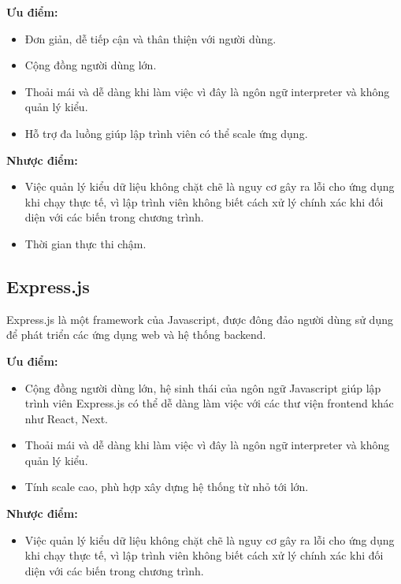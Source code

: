 \textbf{Ưu điểm:}
\begin{itemize}
    \item Đơn giản, dễ tiếp cận và thân thiện với người dùng.
    \item Cộng đồng người dùng lớn.
    \item Thoải mái và dễ dàng khi làm việc vì đây là ngôn ngữ interpreter và không quản lý kiểu.
    \item Hỗ trợ đa luồng giúp lập trình viên có thể scale ứng dụng.
\end{itemize}

\textbf{Nhược điểm:}
\begin{itemize}
    \item Việc quản lý kiểu dữ liệu không chặt chẽ là nguy cơ gây ra lỗi cho ứng dụng khi chạy thực tế, vì lập trình viên không biết cách xử lý chính xác khi đối diện với các biến trong chương trình.
    \item Thời gian thực thi chậm.
\end{itemize}

\subsection{Express.js}
Express.js là một framework của Javascript, được đông đảo người dùng sử dụng để phát triển các ứng dụng web và hệ thống backend.

\textbf{Ưu điểm:}
\begin{itemize}
    \item Cộng đồng người dùng lớn, hệ sinh thái của ngôn ngữ Javascript giúp lập trình viên Express.js có thể dễ dàng làm việc với các thư viện frontend khác như React, Next.
    \item Thoải mái và dễ dàng khi làm việc vì đây là ngôn ngữ interpreter và không quản lý kiểu.
    \item Tính scale cao, phù hợp xây dựng hệ thống từ nhỏ tới lớn.
\end{itemize}

\textbf{Nhược điểm:}
\begin{itemize}
    \item Việc quản lý kiểu dữ liệu không chặt chẽ là nguy cơ gây ra lỗi cho ứng dụng khi chạy thực tế, vì lập trình viên không biết cách xử lý chính xác khi đối diện với các biến trong chương trình.
\end{itemize}

